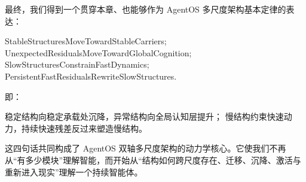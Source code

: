 最终，我们得到一个贯穿本章、也能够作为 AgentOS 多尺度架构基本定律的表达：

\begin{statementbox}
StableStructuresMoveTowardStableCarriers;
UnexpectedResidualsMoveTowardGlobalCognition;
SlowStructuresConstrainFastDynamics;
PersistentFastResidualsRewriteSlowStructures.
\end{statementbox}

即：

\begin{statementbox}
稳定结构向稳定承载处沉降，异常结构向全局认知层提升；
慢结构约束快速动力，持续快速残差反过来塑造慢结构。
\end{statementbox}

这四句话共同构成了 AgentOS 双轴多尺度架构的动力学核心。它使我们不再从“有多少模块”理解智能，而开始从“结构如何跨尺度存在、迁移、沉降、激活与重新进入现实”理解一个持续智能体。
